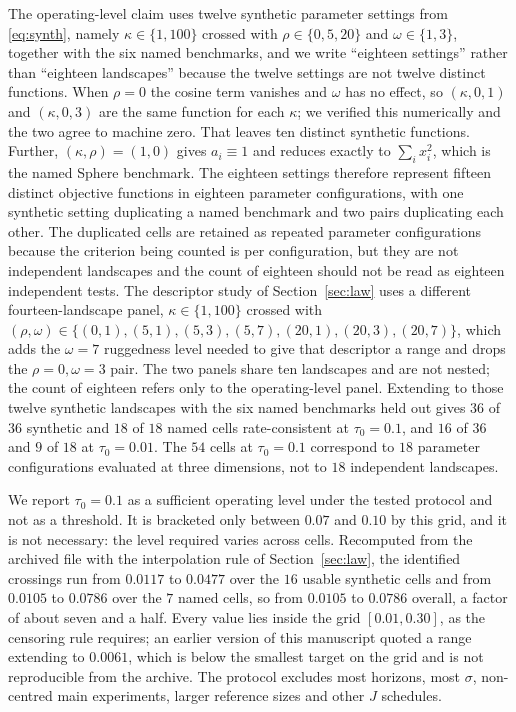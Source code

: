 \documentclass[pdflatex,sn-mathphys-num]{sn-jnl}
\theoremstyle{thmstyleone}
\theoremstyle{thmstyletwo}
\theoremstyle{thmstylethree}
\begin{document}
The operating-level claim uses twelve synthetic parameter settings from \eqref{eq:synth}, namely $\kappa\in\{1,100\}$ crossed with $\rho\in\{0,5,20\}$ and $\omega\in\{1,3\}$, together with the six named benchmarks, and we write ``eighteen settings'' rather than ``eighteen landscapes'' because the twelve settings are not twelve distinct functions. When $\rho=0$ the cosine term vanishes and $\omega$ has no effect, so $(\kappa,0,1)$ and $(\kappa,0,3)$ are the same function for each $\kappa$; we verified this numerically and the two agree to machine zero. That leaves ten distinct synthetic functions. Further, $(\kappa,\rho)=(1,0)$ gives $a_i\equiv1$ and reduces exactly to $\sum_ix_i^2$, which is the named Sphere benchmark. The eighteen settings therefore represent fifteen distinct objective functions in eighteen parameter configurations, with one synthetic setting duplicating a named benchmark and two pairs duplicating each other. The duplicated cells are retained as repeated parameter configurations because the criterion being counted is per configuration, but they are not independent landscapes and the count of eighteen should not be read as eighteen independent tests. The descriptor study of Section~\ref{sec:law} uses a different fourteen-landscape panel, $\kappa\in\{1,100\}$ crossed with $(\rho,\omega)\in\{(0,1),(5,1),(5,3),(5,7),(20,1),(20,3),(20,7)\}$, which adds the $\omega=7$ ruggedness level needed to give that descriptor a range and drops the $\rho=0,\omega=3$ pair. The two panels share ten landscapes and are not nested; the count of eighteen refers only to the operating-level panel. Extending to those twelve synthetic landscapes with the six named benchmarks held out gives $36$ of $36$ synthetic and $18$ of $18$ named cells rate-consistent at $\tau_0=0.1$, and $16$ of $36$ and $9$ of $18$ at $\tau_0=0.01$. The $54$ cells at $\tau_0=0.1$ correspond to $18$ parameter configurations evaluated at three dimensions, not to $18$ independent landscapes.

We report $\tau_0=0.1$ as a sufficient operating level under the tested protocol and not as a threshold. It is bracketed only between $0.07$ and $0.10$ by this grid, and it is not necessary: the level required varies across cells. Recomputed from the archived file with the interpolation rule of Section~\ref{sec:law}, the identified crossings run from $0.0117$ to $0.0477$ over the $16$ usable synthetic cells and from $0.0105$ to $0.0786$ over the $7$ named cells, so from $0.0105$ to $0.0786$ overall, a factor of about seven and a half. Every value lies inside the grid $[0.01,0.30]$, as the censoring rule requires; an earlier version of this manuscript quoted a range extending to $0.0061$, which is below the smallest target on the grid and is not reproducible from the archive. The protocol excludes most horizons, most $\sigma$, non-centred main experiments, larger reference sizes and other $J$ schedules.
\end{document}
